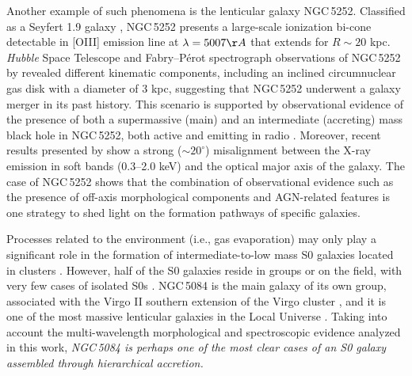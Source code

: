 \documentclass[modern]{CORE-AAS/aastex631}
\begin{document}
Another example of such phenomena is the lenticular galaxy NGC\,5252. Classified as a Seyfert 1.9 galaxy \citep{argyle+1990mnras243_504, osterbrock+1993apj414_552}, NGC\,5252 presents a large-scale ionization bi-cone \citep{tadhunter+1989nat341_422} detectable in [OIII] emission line at $\lambda=5007\AA$ that extends for $R\sim20$ kpc. \emph{Hubble} Space Telescope and Fabry--P\'{e}rot spectrograph observations of NGC\,5252 by \citet{morse+1998apj505_159} revealed different kinematic components, including an inclined circumnuclear gas disk with a diameter of 3 kpc, suggesting that NGC\,5252 underwent a galaxy merger in its past history. This scenario is supported by observational evidence of the presence of both a supermassive (main) and an intermediate (accreting) mass black hole in NGC\,5252, both active and emitting in radio \citep{kim+2015apj814_8, kim+2017apj844_21, yang+2017mnras464_70}. Moreover, recent results presented by \citet{wang+2024arXiv2401.09172} show a strong ($\sim20^{\circ}$) misalignment between the X-ray emission in soft bands (0.3--2.0 keV) and the optical major axis of the galaxy. The case of NGC\,5252 shows that the combination of observational evidence such as the presence of off-axis morphological components and AGN-related features is one strategy to shed light on the formation pathways of specific galaxies. 


Processes related to the environment (i.e., gas evaporation) may only play a significant role in the formation of intermediate-to-low mass S0 galaxies located in clusters \citep{vollmer+2012aap537_143, cerulo+2017mnras472_254}. However, half of the S0 galaxies reside in groups or on the field, with very few cases of isolated S0s \citep{khim+2015apj220_3}. NGC\,5084 is the main galaxy of its own group, associated with the Virgo II southern extension of the Virgo cluster \citep{tully1982apj257_389}, and it is one of the most massive lenticular galaxies in the Local Universe \citep[more massive than 98\% of the S0 galaxies]{ohlson+2024aj167_31}. Taking into account the multi-wavelength morphological and spectroscopic evidence analyzed in this work, \emph{NGC\,5084 is perhaps one of the most clear cases of an S0 galaxy assembled through hierarchical accretion.}
\end{document}
